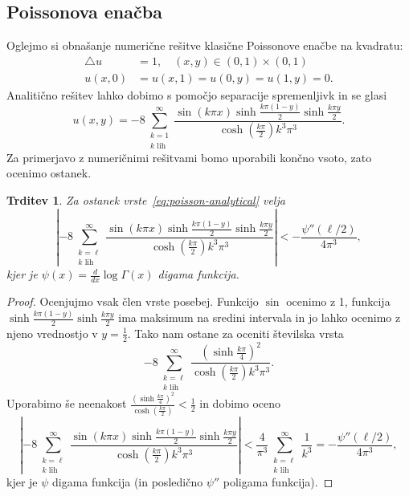 \documentclass[12pt,a4paper,twoside]{article}
\theoremstyle{definition} %
\theoremstyle{plain} %
\newtheorem{trditev}[definicija]{Trditev}
\numberwithin{equation}{section}
\newcommand{\lap}{\triangle}
\newcommand{\dd}[2]{\ensuremath{\frac{d #1}{d #2}}}
\newcommand{\ddx}[1]{\dd{#1}{x}}
\begin{document}
\subsection{Poissonova enačba}
Oglejmo si obnašanje numerične rešitve klasične Poissonove enačbe na kvadratu:
\begin{align}
  \lap u &= 1, \quad (x, y) \in (0, 1) \times (0, 1)
  \label{eq:poisson-problem} \\
  u(x, 0) &= u(x, 1) = u(0, y) = u(1, y) = 0. \nonumber
\end{align}
Analitično rešitev lahko dobimo s pomočjo separacije spremenljivk in se glasi
\begin{equation}
  u(x, y) =
  -8 \sum_{\substack{k=1 \\ k \text{ lih}}}^\infty \frac{ \sin (k \pi  x) \sinh
  \frac{k \pi  (1-y)}{2} \sinh \frac{k \pi
y}{2}}{\cosh(\frac{k\pi}{2})k^3 \pi ^3}.
  \label{eq:poisson-analytical}
\end{equation}
Za primerjavo z numeričnimi rešitvami bomo uporabili končno vsoto, zato ocenimo
ostanek.
\begin{trditev}
  Za ostanek vrste~\eqref{eq:poisson-analytical} velja
  \begin{equation}
    \left|-8 \sum_{\substack{k=\ell \\ k \text{ lih}}}^\infty \frac{ \sin (k \pi  x) \sinh
      \frac{k \pi  (1-y)}{2} \sinh \frac{k \pi y}{2}}{\cosh(\frac{k\pi}{2})k^3
      \pi ^3}\right| < -\frac{\psi''(\ell/2)}{4 \pi^3},
  \end{equation}
  kjer je $\psi(x) = \ddx{}\log\Gamma(x)$ digama funkcija.
\end{trditev}
\begin{proof}
Ocenjujmo vsak člen vrste posebej. Funkcijo $\sin$ ocenimo z 1, funkcija
$\sinh \frac{k \pi  (1-y)}{2} \sinh \frac{k \pi y}{2}$ ima maksimum na sredini
intervala in jo lahko ocenimo z njeno vrednostjo v $y = \frac{1}{2}$.
Tako nam ostane za oceniti številska vrsta
\[
    -8 \sum_{\substack{k=\ell \\ k \text{ lih}}}^\infty
    \frac{\left(\sinh\frac{k \pi}{4}\right)^2}{\cosh(\frac{k\pi}{2})k^3
    \pi ^3} .
\]
Uporabimo še neenakost $\frac{\left(\sinh\frac{k
\pi}{4}\right)^2}{\cosh(\frac{k\pi}{2})} < \frac{1}{2}$ in dobimo oceno
\[
\left|-8 \sum_{\substack{k=\ell \\ k \text{ lih}}}^\infty \frac{ \sin (k \pi  x) \sinh
      \frac{k \pi  (1-y)}{2} \sinh \frac{k \pi y}{2}}{\cosh(\frac{k\pi}{2})k^3
      \pi ^3}\right| < \frac{4}{\pi^3} \sum_{\substack{k=\ell \\ k \text{ lih}}}^\infty
      \frac{1}{k^3} = -\frac{\psi''(\ell/2)}{4 \pi^3},
\]
kjer je $\psi$ digama funkcija (in posledično $\psi''$ poligama funkcija).
\end{proof}
\end{document}
